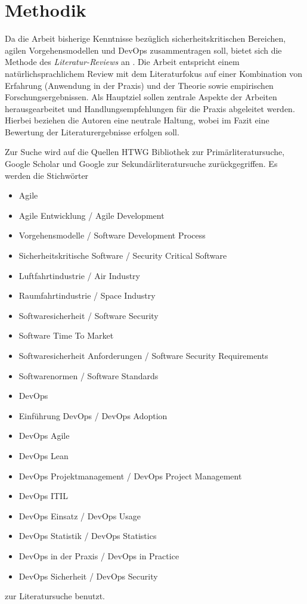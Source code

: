 \section{Methodik}

Da die Arbeit bisherige Kenntnisse bezüglich sicherheitskritischen Bereichen, agilen Vorgehensmodellen und DevOps zusammentragen soll, bietet sich die Methode des \emph{Literatur-Reviews} an \parencite[vgl.][]{Fettke:2006aa}.
Die Arbeit entspricht einem natürlichsprachlichem Review mit dem Literaturfokus auf einer Kombination von Erfahrung (Anwendung in der Praxis) und der Theorie sowie empirischen Forschungsergebnissen.
Als Hauptziel sollen zentrale Aspekte der Arbeiten herausgearbeitet und Handlungsempfehlungen für die Praxis abgeleitet werden.
Hierbei beziehen die Autoren eine neutrale Haltung, wobei im Fazit eine Bewertung der Literaturergebnisse erfolgen soll.

Zur Suche wird auf die Quellen HTWG Bibliothek \parencite[][]{HTWGaa} zur Primärliteratursuche, Google Scholar und Google zur Sekundärliteratursuche zurückgegriffen.
Es werden die Stichwörter
\begin{itemize}
\item Agile
\item Agile Entwicklung / Agile Development
\item Vorgehensmodelle / Software Development Process
\item Sicherheitskritische Software / Security Critical Software
\item Luftfahrtindustrie / Air Industry
\item Raumfahrtindustrie / Space Industry
\item Softwaresicherheit / Software Security
\item Software Time To Market
\item Softwaresicherheit Anforderungen / Software Security Requirements
\item Softwarenormen / Software Standards
\item DevOps
\item Einführung DevOps / DevOps Adoption
\item DevOps Agile
\item DevOps Lean
\item DevOps Projektmanagement / DevOps Project Management
\item DevOps ITIL
\item DevOps Einsatz / DevOps Usage
\item DevOps Statistik / DevOps Statistics
\item DevOps in der Praxis / DevOps in Practice
\item DevOps Sicherheit / DevOps Security
\end{itemize}
zur Literatursuche benutzt.

